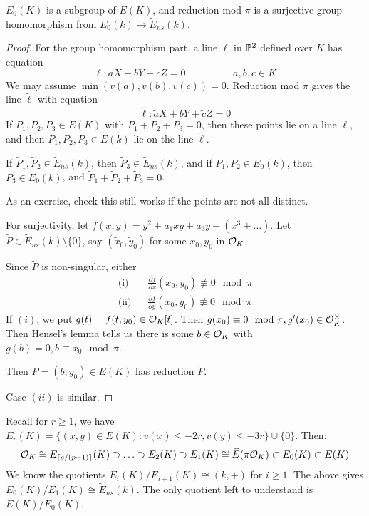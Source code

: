 \documentclass[10pt,a4paper]{article}
\begin{document}
\begin{proposition}
  $E_0(K)$ is a subgroup of $E(K)$, and reduction mod $\pi$ is a surjective group homomorphism from $E_0(k) \to \tilde{E}_{ns}(k)$.
\end{proposition}
\begin{proof}
  For the group homomorphism part, a line $\ell$ in $\P^2$ defined over $K$ has equation
  \[\ell: aX+bY+cZ = 0\hspace{2cm} a,b,c \in K\]
  We may assume $\min(v(a), v(b), v(c)) = 0$. Reduction mod $\pi$ gives the line $\tilde{\ell}$ with equation
  \[\tilde{\ell}: \tilde{a}X+\tilde{b}Y+\tilde{c}Z = 0\]
  If $P_1, P_2, P_3 \in E(K)$ with $P_1+P_2+P_3 = 0$, then these points lie on a line $\ell$, and then $\tilde{P}_1, \tilde{P}_2, \tilde{P}_3 \in \tilde{E}(k)$ lie on the line $\tilde{\ell}$.

  If $\tilde{P}_1, \tilde{P}_2 \in \tilde{E}_{ns}(k)$, then $\tilde{P}_3 \in \tilde{E}_{ns}(k)$, and if $P_1, P_2 \in E_0(k)$, then $P_3 \in E_0(k)$, and $\tilde{P}_1+\tilde{P}_2+\tilde{P}_3=0$.

  As an exercise, check this still works if the points are not all distinct.

  For surjectivity, let $f(x, y) = y^2+a_1xy+a_3y-(x^3+\ldots)$. Let $\tilde{P} \in \tilde{E}_{ns}(k) \setminus \{0\}$, say $(\tilde{x}_0, \tilde{y}_0)$ for some $x_0, y_0$ in $\O_K$.

  Since $\tilde{P}$ is non-singular, either
  \begin{align*}
    \text{(i)}&\;\;\; \frac{\partial f}{\partial x}(x_0, y_0) \nequiv 0 \mod \pi\\
    \text{(ii)}&\;\;\; \frac{\partial f}{\partial y}(x_0, y_0) \nequiv 0 \mod \pi
  \end{align*}
  If $(i)$, we put $g(t) = f(t, y_0)\in \O_K[t]$. Then $g(x_0) \equiv 0 \mod \pi, g'(x_0)\in \O_K^\times$. Then Hensel's lemma tells us there is some $b \in \O_K$ with $g(b) = 0, b \equiv x_0 \mod \pi$.

  Then $P = (b, y_0) \in E(K)$ has reduction $\tilde{P}$.

  Case $(ii)$ is similar.
\end{proof}
Recall for $r \geq 1$, we have $E_r(K) = \{(x,y) \in E(K): v(x) \leq -2r, v(y) \leq -3r\}\cup\{0\}$. Then:
\[\O_K \cong E_{\ceil{e/(p-1)}}(K) \supset \ldots \supset E_2(K) \supset E_1(K) \cong \hat{E}(\pi\O_K) \subset E_0(K) \subset E(K)\]
We know the quotients $E_i(K)/E_{i+1}(K) \cong (k, +)$ for $i \geq 1$. The above gives $E_0(K)/E_1(K) \cong \tilde{E}_{ns}(k)$. The only quotient left to understand is $E(K)/E_0(K)$.
\end{document}
